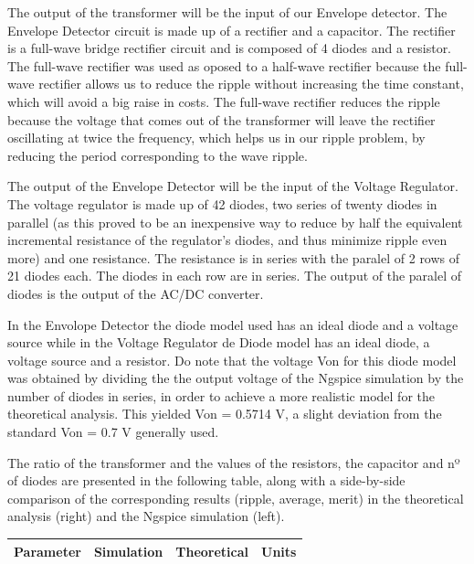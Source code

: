 The output of the transformer will be the input of our Envelope detector. The Envelope Detector circuit is made up of a rectifier and a capacitor. The rectifier is a full-wave bridge rectifier circuit and is composed of 4 diodes and a resistor. The full-wave rectifier was used as oposed to a half-wave rectifier because the full-wave rectifier allows us to reduce the ripple without increasing the time constant, which will avoid a big raise in costs. The full-wave rectifier reduces the ripple because the voltage that comes out of the transformer will leave the rectifier oscillating at twice the frequency, which helps us in our ripple problem, by reducing the period corresponding to the wave ripple.

The output of the Envelope Detector will be the input of the Voltage Regulator. The voltage regulator is made up of 42 diodes, two series of twenty diodes in parallel (as this proved to be an inexpensive way to reduce by half the equivalent incremental resistance of the regulator's diodes, and thus minimize ripple even more) and one resistance. The resistance is in series with the paralel of 2 rows of 21 diodes each. The diodes in each row are in series. The output of the paralel of diodes is the output of the AC/DC converter.

In the Envolope Detector the diode model used has an ideal diode and a voltage source while in the Voltage Regulator de Diode model has an ideal diode, a voltage source and a resistor. Do note that the voltage Von for this diode model was obtained by dividing the the output voltage of the Ngspice simulation by the number of diodes in series, in order to achieve a more realistic model for the theoretical analysis. This yielded Von = 0.5714 V, a slight deviation from the standard Von = 0.7 V generally used.

The ratio of the transformer and the values of the resistors, the capacitor and nº of diodes are presented in the following table, along with a side-by-side comparison of the corresponding results (ripple, average, merit) in the theoretical analysis (right) and the Ngspice simulation (left).

\hfill
 \parbox{1\linewidth}{
  \centering
  \begin{tabular}{|l|l|l|r|}
    \hline    
    {\bf Parameter} & {\bf Simulation} & {\bf Theoretical } & {\bf Units }\\ \hline
    
  \end{tabular}
  \label{tab:results}
    

  }


